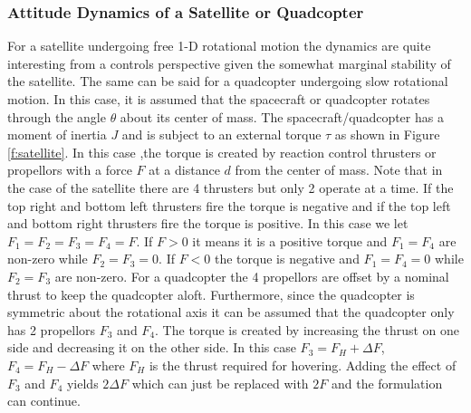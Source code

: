 \subsubsection{Attitude Dynamics of a Satellite or Quadcopter}

For a satellite undergoing free 1-D rotational motion the dynamics are quite interesting from a controls perspective given the somewhat marginal stability of the satellite. The same can be said for a quadcopter undergoing slow rotational motion. In this case, it is assumed that the spacecraft or quadcopter rotates through the angle $\theta$ about its center of mass. The spacecraft/quadcopter has a moment of inertia $J$ and is subject to an external torque $\tau$ as shown in Figure \ref{f:satellite}. In this case ,the torque is created by reaction control thrusters or propellors with a force $F$ at a distance $d$ from the center of mass. Note that in the case of the satellite there are 4 thrusters but only 2 operate at a time. If the top right and bottom left thrusters fire the torque is negative and if the top left and bottom right thrusters fire the torque is positive. In this case we let $F_1=F_2=F_3=F_4=F$. If $F>0$ it means it is a positive torque and $F_1=F_4$ are non-zero while $F_2=F_3=0$. If $F<0$ the torque is negative and $F_1=F_4=0$ while $F_2=F_3$ are non-zero. For a quadcopter the 4 propellors are offset by a nominal thrust to keep the quadcopter aloft. Furthermore, since the quadcopter is symmetric about the rotational axis it can be assumed that the quadcopter only has 2 propellors $F_3$ and $F_4$. The torque is created by increasing the thrust on one side and decreasing it on the other side. In this case $F_3=F_H+\Delta F$, $F_4=F_H-\Delta F$ where $F_H$ is the thrust required for hovering. Adding the effect of $F_3$ and $F_4$ yields $2\Delta F$ which can just be replaced with $2F$ and the formulation can continue. 
